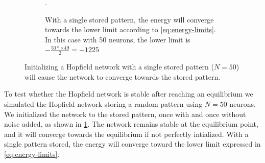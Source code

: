 \begin{figure}[H]
\begin{subfigure}{0.49\textwidth}
        \caption{With a single stored pattern, the energy will converge towards the lower limit according to \cref{eq:energy-limits}. In this case with 50 neurons, the lower limit is $-\frac{50*\times 49}{2} = -1225$}.
    \end{subfigure}
    \caption{Initializing a Hopfield network with a single stored pattern ($N = 50$) will cause the network to converge towards the stored pattern.}
    \label{fig:stable}
\end{figure}
To test whether the Hopfield network is stable after reaching an equilibrium we simulated the Hopfield network storing a random pattern using $N=50$ neurons. We initialized the network to the stored pattern, once with and once without noise added, as shown in \cref{fig:stable}. The network remains stable at the equilibrium point, and it will converge towards the equilibrium if not perfectly intialized. With a single pattern stored, the energy will converge toward the lower limit expressed in \cref{eq:energy-limits}.

